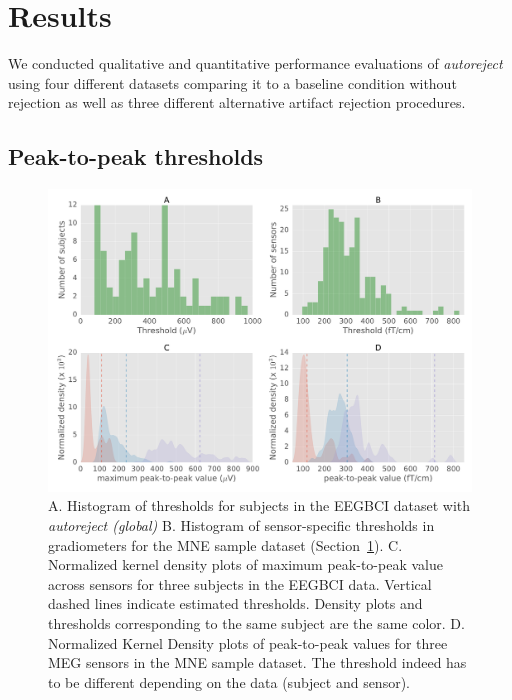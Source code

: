 \section{Results}
\label{sec:results}

We conducted qualitative and quantitative performance evaluations of \emph{autoreject} using four different datasets comparing it to a baseline condition without rejection as well as three different alternative artifact rejection procedures.

\subsection{Peak-to-peak thresholds}

\begin{figure}[htb!]
	\centering
	\includegraphics[width=0.9\linewidth]{figures/figure6.pdf}
    \caption{A. Histogram of thresholds for subjects in the EEGBCI dataset with \emph{autoreject (global)} B. Histogram of sensor-specific thresholds in gradiometers for the MNE sample dataset (Section~\ref{sec:results}). C. Normalized kernel density plots of maximum peak-to-peak value across sensors for three subjects in the EEGBCI data. Vertical dashed lines indicate estimated thresholds. Density plots and thresholds corresponding to the same subject are the same color. D. Normalized Kernel Density plots of peak-to-peak values for three MEG sensors in the MNE sample dataset. The threshold indeed has to be different depending on the data (subject and sensor).}
    \label{fig:hist}
\end{figure}


